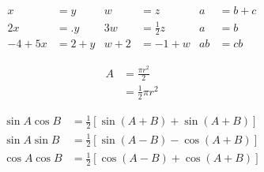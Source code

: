 \documentclass[a4paper]{article}
\begin{document}
\begin{align*}
x&=y            & w &=z                 & a&=b+c\\
2x&=.y          & 3w&=\frac{1}{2}z      & a&=b\\
-4 + 5x&=2+y    & w+2&=-1+w             & ab&=cb
\end{align*}

\begin{equation}
\begin{split}
A & = \frac{\pi r^2}{2} \\
 & = \frac{1}{2} \pi r^2
\end{split}
\end{equation}

\begin{align*}
\sin A \cos B &= \frac{1}{2}\left[ \sin(A+B)+\sin(A+B)\right]\\
\sin A \sin B &= \frac{1}{2}\left[ \sin(A-B)-\cos(A+B)\right]\\
\cos A \cos B &= \frac{1}{2}\left[ \cos(A-B)+\cos(A+B)\right]
\end{align*}
\end{document}
